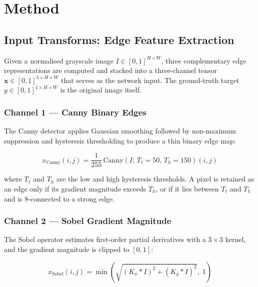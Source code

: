 \documentclass[10pt,twocolumn]{article}
\begin{document}
\section{Method}
\label{sec:method}

\subsection{Input Transforms: Edge Feature Extraction}
\label{sec:transforms}

Given a normalised grayscale image $I \in [0,1]^{H \times W}$, three
complementary edge representations are computed and stacked into a
three-channel tensor $\mathbf{x} \in [0,1]^{3 \times H \times W}$ that serves
as the network input.
The ground-truth target $y \in [0,1]^{1 \times H \times W}$ is the original
image itself.

\subsubsection*{Channel 1 --- Canny Binary Edges}

The Canny detector \cite{canny1986} applies Gaussian smoothing followed by
non-maximum suppression and hysteresis thresholding to produce a thin binary
edge map:

\begin{equation}
  x_{\text{Canny}}(i,j) = \frac{1}{255}\,\text{Canny}\!\left(I;\,T_{\ell}=50,\,T_{h}=150\right)(i,j)
  \label{eq:canny}
\end{equation}

where $T_{\ell}$ and $T_h$ are the low and high hysteresis thresholds.
A pixel is retained as an edge only if its gradient magnitude exceeds $T_h$, or
if it lies between $T_{\ell}$ and $T_h$ and is 8-connected to a strong edge.

\subsubsection*{Channel 2 --- Sobel Gradient Magnitude}

The Sobel operator estimates first-order partial derivatives with a $3\times3$
kernel, and the gradient magnitude is clipped to $[0,1]$:

\begin{equation}
  x_{\text{Sobel}}(i,j) = \min\!\left(\sqrt{(K_x * I)^2 + (K_y * I)^2},\; 1\right)
  \label{eq:sobel}
\end{equation}
\end{document}
